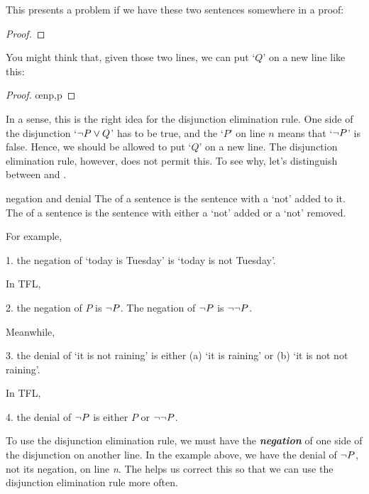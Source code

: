 This presents a problem if we have these two sentences somewhere in a proof:
\begin{proof}
\end{proof}
You might think that, given those two lines, we can put `$Q$' on a new line like this:
\begin{proof}
	 \oe{np,p}
\end{proof}
In a sense, this is the right idea for the disjunction elimination rule. One side of the disjunction `${\neg} P \vee Q$' has to be true, and the `$P$' on line $n$ means that `${\neg} P$' is false. Hence, we should be allowed to put `$Q$' on a new line. The disjunction elimination rule, however, does not permit this. To see why, let's distinguish between  and .

\begin{factboxy}{negation and denial}
The  of a sentence is the sentence with a `not' added to it.\\ 
The  of a sentence is the sentence with either a `not' added or a `not' removed.
\end{factboxy}

\noindent For example, 
\begin{earg}
\item[1.] the negation of `today is Tuesday' is `today is not Tuesday'. 
\end{earg}
In TFL, 
\begin{earg}
\item[2.] the negation of $P$ is ${\neg} P$. The negation of ${\neg} P$ is ${\neg}{\neg} P$.
\end{earg}
Meanwhile,
\begin{earg}
\item[3.] the denial of `it is not raining' is either (a) `it is raining' or (b) `it is not not raining'. 
\end{earg}
In TFL,
\begin{earg}
\item[4.] the denial of ${\neg} P$ is either $P$ or ${\neg}{\neg} P$.
\end{earg}
To use the disjunction elimination rule, we must have the \textbf{\textit{negation}} of one side of the disjunction on another line. In the example above, we have the denial of ${\neg} P$, not its negation, on line \textit{n}. The  helps us correct this so that we can use the disjunction elimination rule more often. 

